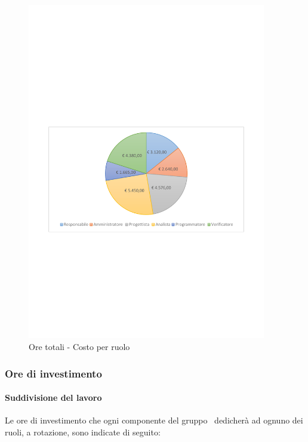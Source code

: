 \documentclass[../PianoProgetto.tex]{subfiles}
\begin{document}
	\begin{figure}[!h]
		\centering
		\includegraphics[width=0.93\textwidth , trim=2cm 9.5cm 2cm 11cm]{grafici/Riepilogo/Totali/costo}
			\caption{Ore totali - Costo per ruolo}
		\label{fig:CircleChart-totale_ore}
	\end{figure}
\vfill
\newpage
	
	\subsubsection{Ore di investimento}
				\paragraph{Suddivisione del lavoro}
					Le ore di investimento che ogni componente del gruppo \leaf\ dedicherà ad ognuno dei ruoli, a rotazione, sono indicate di seguito:
	
\end{document}
